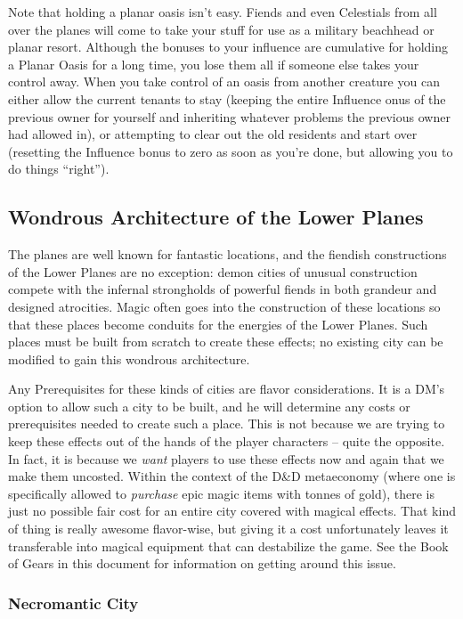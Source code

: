 Note that holding a planar oasis isn't easy. Fiends and even Celestials from all over the planes will come to take your stuff for use as a military beachhead or planar resort. Although the bonuses to your influence are cumulative for holding a Planar Oasis for a long time, you lose them all if someone else takes your control away. When you take control of an oasis from another creature you can either allow the current tenants to stay (keeping the entire Influence onus of the previous owner for yourself and inheriting whatever problems the previous owner had allowed in), or attempting to clear out the old residents and start over (resetting the Influence bonus to zero as soon as you're done, but allowing you to do things ``right'').

\subsection{Wondrous Architecture of the Lower Planes}

The planes are well known for fantastic locations, and the fiendish constructions of the Lower Planes are no exception: demon cities of unusual construction compete with the infernal strongholds of powerful fiends in both grandeur and designed atrocities. Magic often goes into the construction of these locations so that these places become conduits for the energies of the Lower Planes. Such places must be built from scratch to create these effects; no existing city can be modified to gain this wondrous architecture.

Any Prerequisites for these kinds of cities are flavor considerations. It is a DM's option to allow such a city to be built, and he will determine any costs or prerequisites needed to create such a place. This is not because we are trying to keep these effects out of the hands of the player characters -- quite the opposite. In fact, it is because we \textit{want} players to use these effects now and again that we make them uncosted. Within the context of the D\&D metaeconomy (where one is specifically allowed to \textit{purchase} epic magic items with tonnes of gold), there is just no possible fair cost for an entire city covered with magical effects. That kind of thing is really awesome flavor-wise, but giving it a cost unfortunately leaves it transferable into magical equipment that can destabilize the game. See the Book of Gears in this document for information on getting around this issue.

\subsubsection{Necromantic City}

